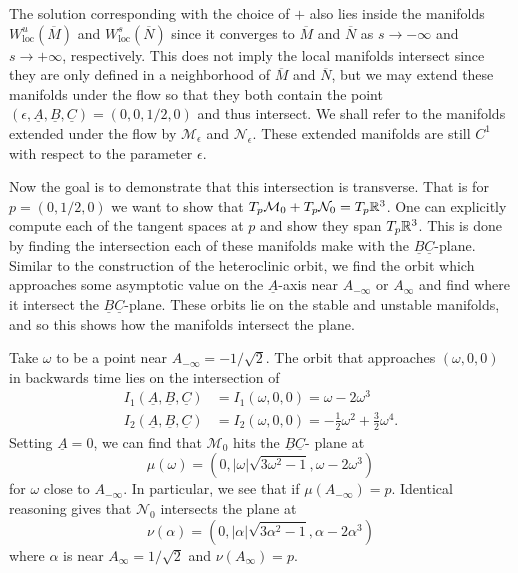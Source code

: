 The solution corresponding with the choice of \(+\) also lies inside the manifolds \(W^u_{\mathrm{loc}}(\overline M)\) and \(W^s_{\mathrm{loc}}(\overline N)\) since it converges to \(\overline M\) and \(\overline N\) as \(s\to - \infty \) and \(s\to +\infty\), respectively. This does not imply the local manifolds intersect since they are only defined in a neighborhood of \(\overline M\) and \(\overline N\), but we may extend these manifolds under the flow so that they both contain the point \((\epsilon , \underline A, \underline B, \underline C) = (0, 0, 1/2, 0)\) and thus intersect. We shall refer to the manifolds extended under the flow by \(\mathcal M_\epsilon\) and \(\mathcal N_\epsilon\). These extended manifolds are still \(C^1\) with respect to the parameter \(\epsilon\).

Now the goal is to demonstrate that this intersection is transverse. That is for \(p = (0,1/2,0)\) we want to show that \(T_p\mathcal M_0 + T_p \mathcal N_0 = T_p \mathbb{R}^3\). One can explicitly compute each of the tangent spaces at \(p\) and show they span \(T_p\mathbb{R}^3\). This is done by finding the intersection each of these manifolds make with the \(\underline B\underline C\)-plane. Similar to the construction of the heteroclinic orbit, we find the orbit which approaches some asymptotic value on the \(\underline A\)-axis near \(A_{-\infty}\) or \(A_{\infty}\) and find where it intersect the \(\underline B\underline C\)-plane. These orbits lie on the stable and unstable manifolds, and so this shows how the manifolds intersect the plane.

Take \(\omega\) to be a point near \(A_{-\infty} = - 1/\sqrt 2\). The orbit that approaches \((\omega, 0, 0)\) in backwards time lies on the intersection of 
\begin{equation}
	\begin{aligned}
		I_1(\underline A, \underline B, \underline C) &= I_1(\omega, 0, 0) = \omega - 2\omega^3 \\
		I_2(\underline A, \underline B, \underline C) &= I_2(\omega, 0, 0) = - \frac 1 2 \omega^2 + \frac 3 2 \omega^4.
	\end{aligned}
\end{equation}
Setting \(\underline A = 0\), we can find that \(\mathcal M_0\) hits the \(\underline B \underline C\)- plane at 
\begin{equation}
	\mu(\omega) = (0, |\omega| \sqrt{3\omega^2 -1 }, \omega - 2\omega^3)
\end{equation}
for \(\omega\) close to \(A_{-\infty}\). In particular, we see that if \(\mu(A_{-\infty}) = p\). Identical reasoning gives that \(\mathcal N_0\) intersects the plane at 
\begin{equation}\label{intersection-with-plane}
	\nu(\alpha) = (0, |\alpha| \sqrt{3\alpha^2 -1 }, \alpha - 2\alpha^3)
\end{equation}
where \(\alpha\) is near \(A_\infty = 1 / \sqrt 2\) and \(\nu (A_{\infty} ) = p\).

